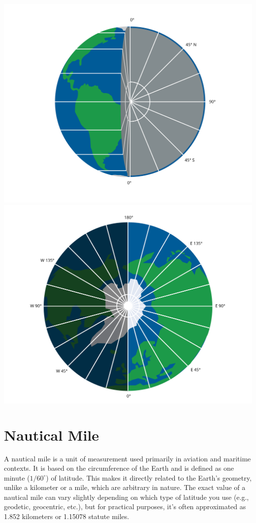\includegraphics[width=\textwidth]{latExplanation.png}
\includegraphics[width=\textwidth]{longExplanation.png}



\section{Nautical Mile}

A nautical mile is a unit of measurement used primarily in aviation
and maritime contexts. It is based on the circumference of the Earth
and is defined as one minute ($1/60^{\circ}$) of latitude. This makes
it directly related to the Earth's geometry, unlike a kilometer or a
mile, which are arbitrary in nature. The exact value of a nautical
mile can vary slightly depending on which type of latitude you use
(e.g., geodetic, geocentric, etc.), but for practical purposes, it's
often approximated as 1.852 kilometers or 1.15078 statute miles.

